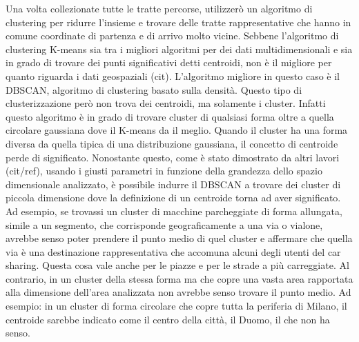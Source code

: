 \documentclass[a4paper]{report}
\begin{document}
	Una volta collezionate tutte le tratte percorse, utilizzerò un algoritmo di clustering per ridurre l'insieme e trovare delle tratte rappresentative che hanno in comune coordinate di partenza e di arrivo molto vicine. Sebbene l'algoritmo di clustering K-means sia tra i migliori algoritmi per dei dati multidimensionali e sia in grado di trovare dei punti significativi detti centroidi, non è il migliore per quanto riguarda i dati geospaziali (cit). L'algoritmo migliore in questo caso è il DBSCAN, algoritmo di clustering basato sulla densità. Questo tipo di clusterizzazione però non trova dei centroidi, ma solamente i cluster. Infatti questo algoritmo è in grado di trovare cluster di qualsiasi forma oltre a quella circolare gaussiana dove il K-means da il meglio. Quando il cluster ha una forma diversa da quella tipica di una distribuzione gaussiana, il concetto di centroide perde di significato. Nonostante questo, come è stato dimostrato da altri lavori (cit/ref), usando i giusti parametri in funzione della grandezza dello spazio dimensionale analizzato, è possibile indurre il DBSCAN a trovare dei cluster di piccola dimensione dove la definizione di un centroide torna ad aver significato. Ad esempio, se trovassi un cluster di macchine parcheggiate di forma allungata, simile a un segmento, che corrisponde geograficamente a una via o vialone, avrebbe senso poter prendere il punto medio di quel cluster e affermare che quella via è una destinazione rappresentativa che accomuna alcuni degli utenti del car sharing. Questa cosa vale anche per le piazze e per le strade a più carreggiate. Al contrario, in un cluster della stessa forma ma che copre una vasta area rapportata alla dimensione dell'area analizzata non avrebbe senso trovare il punto medio. Ad esempio: in un cluster di forma circolare che copre tutta la periferia di Milano, il centroide sarebbe indicato come il centro della città, il Duomo, il che non ha senso.
		

	
	
\end{document}
